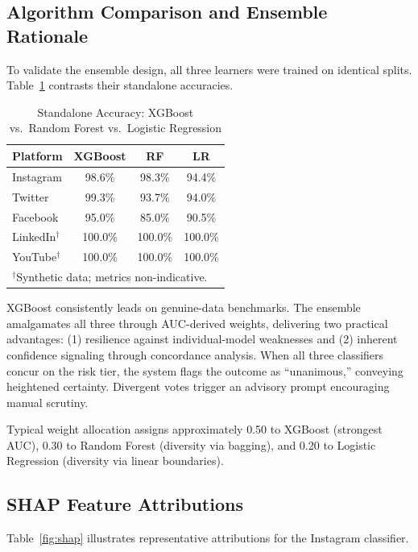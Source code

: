 \documentclass[conference]{IEEEtran}
\begin{document}
\subsection{Algorithm Comparison and Ensemble Rationale}

To validate the ensemble design, all three learners were trained on identical splits. Table~\ref{tab:comparison} contrasts their standalone accuracies.

\begin{table}[htbp]
\caption{Standalone Accuracy: XGBoost vs.\ Random Forest vs.\ Logistic Regression}
\label{tab:comparison}
\centering
\begin{tabular}{lccc}
\toprule
\textbf{Platform} & \textbf{XGBoost} & \textbf{RF} & \textbf{LR} \\
\midrule
Instagram & 98.6\% & 98.3\% & 94.4\% \\
Twitter & 99.3\% & 93.7\% & 94.0\% \\
Facebook & 95.0\% & 85.0\% & 90.5\% \\
LinkedIn$^\dagger$ & 100.0\% & 100.0\% & 100.0\% \\
YouTube$^\dagger$ & 100.0\% & 100.0\% & 100.0\% \\
\bottomrule
\multicolumn{4}{l}{\footnotesize $^\dagger$Synthetic data; metrics non-indicative.}
\end{tabular}
\end{table}

XGBoost consistently leads on genuine-data benchmarks. The ensemble amalgamates all three through AUC-derived weights, delivering two practical advantages: (1) resilience against individual-model weaknesses and (2) inherent confidence signaling through concordance analysis. When all three classifiers concur on the risk tier, the system flags the outcome as ``unanimous,'' conveying heightened certainty. Divergent votes trigger an advisory prompt encouraging manual scrutiny.

Typical weight allocation assigns approximately 0.50 to XGBoost (strongest AUC), 0.30 to Random Forest (diversity via bagging), and 0.20 to Logistic Regression (diversity via linear boundaries).

\subsection{SHAP Feature Attributions}

Table~\ref{fig:shap} illustrates representative attributions for the Instagram classifier.
\end{document}
